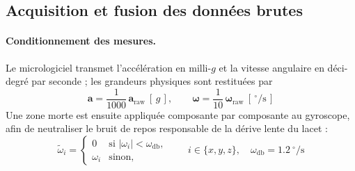 \documentclass{tropLaClasse}
\begin{document}
\subsection{Acquisition et fusion des données brutes}
\label{subsec:acquisition}

\paragraph{Conditionnement des mesures.}
Le micrologiciel transmet l'accélération en milli-$g$ et la vitesse angulaire en déci-degré par seconde ; les grandeurs physiques sont restituées par
\begin{equation}
\mathbf{a}=\frac{1}{1000}\,\mathbf{a}_{\text{raw}}\ [\,g\,],
\qquad
\boldsymbol{\omega}=\frac{1}{10}\,\boldsymbol{\omega}_{\text{raw}}\ [\,^\circ\!/\mathrm{s}\,]
\end{equation}
Une zone morte est ensuite appliquée composante par composante au gyroscope, afin de neutraliser le bruit de repos responsable de la dérive lente du lacet :
\begin{equation}
\tilde{\omega}_i=
\begin{cases}
0 & \text{si } |\omega_i|<\omega_{\mathrm{db}},\\
\omega_i & \text{sinon,}
\end{cases}
\qquad i\in\{x,y,z\},\quad \omega_{\mathrm{db}}=1{.}2~^\circ\!/\mathrm{s}
\end{equation}
\end{document}
